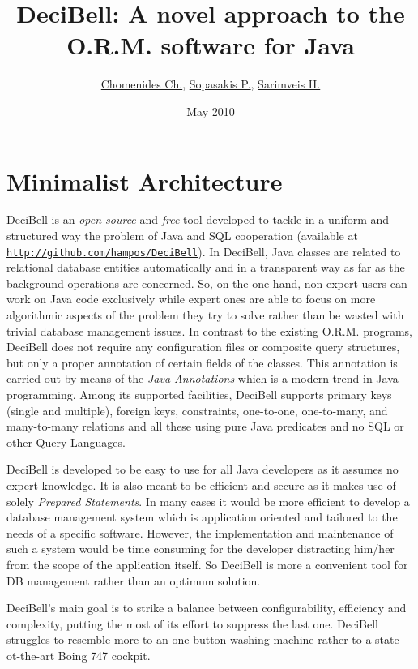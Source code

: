 \documentclass[a4paper,10pt]{article}
\title{DeciBell: A novel approach to the O.R.M. software for Java\texttrademark}
\author{\href{mailto:hampos@me.com}{Chomenides Ch.}, \href{mailto:chvng@mail.ntua.gr}{Sopasakis P.}, \href{mailto:hsarimv@central.ntua.gr}{Sarimveis H.}}
\date{May 2010}
\begin{document}
 \maketitle

\section*{Minimalist Architecture}\label{minimal}
DeciBell is an \emph{open source} and \emph{free} tool developed 
to tackle in a uniform and structured way the problem of 
Java and SQL cooperation (available at \href{http://github.com/hampos/DeciBell}{\texttt{http://github.com/hampos/DeciBell}}). In DeciBell, Java 
classes are related to relational database entities automatically and in a 
transparent way as far as the background operations are concerned. So, on the 
one hand, non-expert users can work on Java code exclusively while 
expert ones are able to focus on more algorithmic aspects of the problem they 
try to solve rather than be wasted with trivial database management issues. In contrast 
to the existing O.R.M. programs, DeciBell does not require any configuration files 
or composite query structures, but only a proper annotation of certain fields 
of the classes. This annotation is carried out by means of the \emph{Java Annotations}
which is a modern trend in Java programming. Among its supported facilities, 
DeciBell supports primary keys (single and multiple), foreign keys, 
constraints, one-to-one, one-to-many, and many-to-many relations and all these using
pure Java predicates and no SQL or other Query Languages.

DeciBell is developed to be easy to use for all Java developers as it assumes no 
expert knowledge. It is also meant to be efficient and secure as it makes use of
solely \emph{Prepared Statements}. In many cases it would be more efficient
to develop a database management system which is application oriented and tailored to 
the needs of a specific software. However, the implementation and maintenance of such a 
system would be time consuming for the developer distracting him/her from the 
scope of the application itself. So DeciBell is more a convenient tool for DB management rather
than an optimum solution.

DeciBell's main goal is to strike a balance between configurability, efficiency and complexity,
putting the most of its effort to suppress the last one. DeciBell struggles to resemble more to 
an one-button washing machine rather to a state-ot-the-art Boing 747 cockpit.
\end{document}
